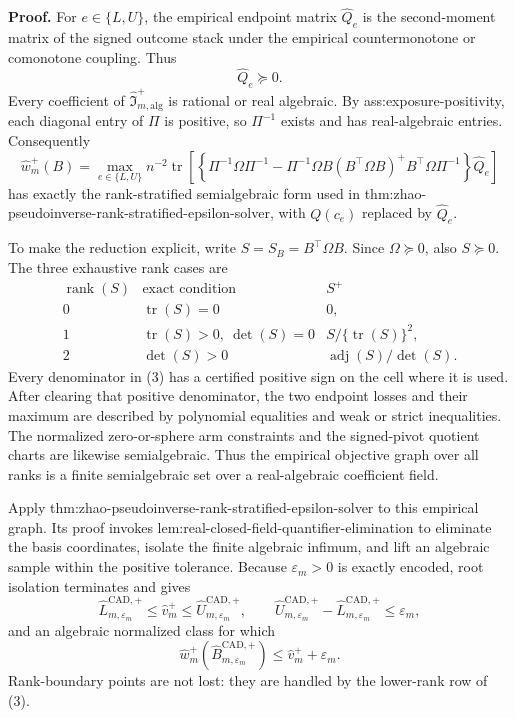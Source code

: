 \textbf{Proof.}
For \(e\in\{L,U\}\), the empirical endpoint matrix \(\widehat Q_e\) is the second-moment matrix of the signed outcome stack under the empirical countermonotone or comonotone coupling.  Thus
\[
\widehat Q_e\succeq0.
\tag{1}
\]
Every coefficient of \(\widehat{\mathfrak I}_{m,\mathrm{alg}}^+\) is rational or real algebraic.  By ass:exposure-positivity, each diagonal entry of \(\Pi\) is positive, so \(\Pi^{-1}\) exists and has real-algebraic entries.  Consequently
\[
\widehat w_m^+(B)=
\max_{e\in\{L,U\}}n^{-2}\operatorname{tr}\!\left[
\left\{\Pi^{-1}\Omega\Pi^{-1}
-\Pi^{-1}\Omega B(B^{\top}\Omega B)^+B^{\top}\Omega\Pi^{-1}\right\}
\widehat Q_e\right]
\tag{2}
\]
has exactly the rank-stratified semialgebraic form used in thm:zhao-pseudoinverse-rank-stratified-epsilon-solver, with \(Q(c_e)\) replaced by \(\widehat Q_e\).

To make the reduction explicit, write \(S=S_B=B^{\top}\Omega B\).  Since \(\Omega\succeq0\), also \(S\succeq0\).  The three exhaustive rank cases are
\[
\begin{array}{c|c|c}
\operatorname{rank}(S)&\text{exact condition}&S^+\\ \hline
0&\operatorname{tr}(S)=0&0,\\[1mm]
1&\operatorname{tr}(S)>0,\ \det(S)=0&S/\{\operatorname{tr}(S)\}^2,\\[1mm]
2&\det(S)>0&\operatorname{adj}(S)/\det(S).
\end{array}
\tag{3}
\]
Every denominator in (3) has a certified positive sign on the cell where it is used.  After clearing that positive denominator, the two endpoint losses and their maximum are described by polynomial equalities and weak or strict inequalities.  The normalized zero-or-sphere arm constraints and the signed-pivot quotient charts are likewise semialgebraic.  Thus the empirical objective graph over all ranks is a finite semialgebraic set over a real-algebraic coefficient field.

Apply thm:zhao-pseudoinverse-rank-stratified-epsilon-solver to this empirical graph.  Its proof invokes lem:real-closed-field-quantifier-elimination to eliminate the basis coordinates, isolate the finite algebraic infimum, and lift an algebraic sample within the positive tolerance.  Because \(\varepsilon_m>0\) is exactly encoded, root isolation terminates and gives
\[
\widehat L_{m,\varepsilon_m}^{\mathrm{CAD},+}
\le\widehat v_m^+
\le\widehat U_{m,\varepsilon_m}^{\mathrm{CAD},+},
\qquad
\widehat U_{m,\varepsilon_m}^{\mathrm{CAD},+}
-\widehat L_{m,\varepsilon_m}^{\mathrm{CAD},+}
\le\varepsilon_m,
\tag{4}
\]
and an algebraic normalized class for which
\[
\widehat w_m^+(\widehat B_{m,\varepsilon_m}^{\mathrm{CAD},+})
\le\widehat v_m^++\varepsilon_m.
\tag{5}
\]
Rank-boundary points are not lost: they are handled by the lower-rank row of (3).


